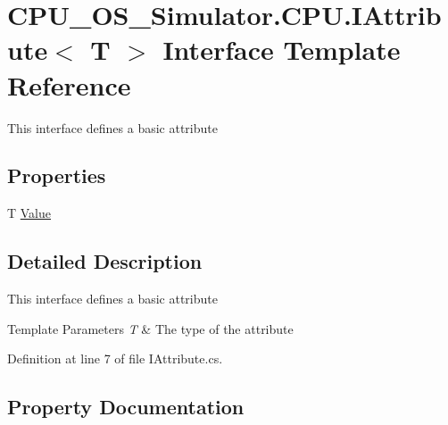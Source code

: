 \hypertarget{interface_c_p_u___o_s___simulator_1_1_c_p_u_1_1_i_attribute}{}\section{C\+P\+U\+\_\+\+O\+S\+\_\+\+Simulator.\+C\+P\+U.\+I\+Attribute$<$ T $>$ Interface Template Reference}
\label{interface_c_p_u___o_s___simulator_1_1_c_p_u_1_1_i_attribute}


This interface defines a basic attribute  


\subsection*{Properties}
\begin{DoxyCompactItemize}
\item 
T \hyperlink{interface_c_p_u___o_s___simulator_1_1_c_p_u_1_1_i_attribute_a7c1cc8ee7f3ce5334f7a4ace4a9db633}{Value}
\end{DoxyCompactItemize}


\subsection{Detailed Description}
This interface defines a basic attribute 


\begin{DoxyTemplParams}{Template Parameters}
{\em T} & The type of the attribute \\
\hline
\end{DoxyTemplParams}


Definition at line 7 of file I\+Attribute.\+cs.



\subsection{Property Documentation}
\hypertarget{interface_c_p_u___o_s___simulator_1_1_c_p_u_1_1_i_attribute_a7c1cc8ee7f3ce5334f7a4ace4a9db633}{}
